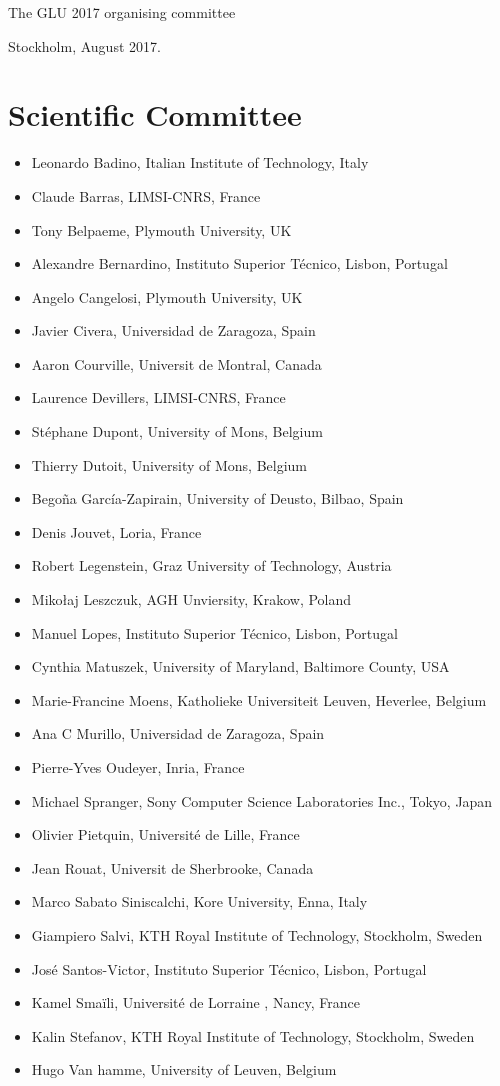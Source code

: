 \documentclass{confproc}
\begin{document}
\vspace{1cm}
\noindent The GLU 2017 organising committee

\noindent Stockholm, August 2017.

\newpage
\section*{Scientific Committee}
\begin{itemize}
\item Leonardo Badino, Italian Institute of Technology, Italy
\item Claude Barras, LIMSI-CNRS, France
\item Tony Belpaeme, Plymouth University, UK
\item Alexandre Bernardino, Instituto Superior Técnico, Lisbon, Portugal
\item Angelo Cangelosi, Plymouth University, UK
\item Javier Civera, Universidad de Zaragoza, Spain
\item Aaron Courville, Universit de Montral, Canada
\item Laurence Devillers, LIMSI-CNRS, France
\item Stéphane Dupont, University of Mons, Belgium
\item Thierry Dutoit, University of Mons, Belgium
\item Begoña García-Zapirain, University of Deusto, Bilbao, Spain
\item Denis Jouvet, Loria, France
\item Robert Legenstein, Graz University of Technology, Austria
\item Mikołaj Leszczuk, AGH Unviersity, Krakow, Poland
\item Manuel Lopes, Instituto Superior Técnico, Lisbon, Portugal
\item Cynthia Matuszek, University of Maryland, Baltimore County, USA
\item Marie-Francine Moens, Katholieke Universiteit Leuven, Heverlee, Belgium
\item Ana C Murillo, Universidad de Zaragoza, Spain
\item Pierre-Yves Oudeyer, Inria, France
\item Michael Spranger, Sony Computer Science Laboratories Inc., Tokyo, Japan
\item Olivier Pietquin, Université de Lille, France
\item Jean Rouat, Universit de Sherbrooke, Canada
\item Marco Sabato Siniscalchi, Kore University, Enna, Italy
\item Giampiero Salvi, KTH Royal Institute of Technology, Stockholm, Sweden
\item José Santos-Victor, Instituto Superior Técnico, Lisbon, Portugal
\item Kamel Smaïli, Université de Lorraine , Nancy, France
\item Kalin Stefanov, KTH Royal Institute of Technology, Stockholm, Sweden
\item Hugo Van hamme, University of Leuven, Belgium
\end{itemize}
\newpage
\tableofcontents
\end{document}
